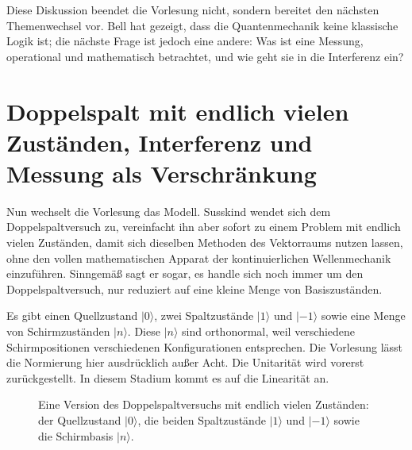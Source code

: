 Diese Diskussion beendet die Vorlesung nicht, sondern bereitet den nächsten Themenwechsel vor. Bell hat gezeigt, dass die Quantenmechanik keine klassische Logik ist; die nächste Frage ist jedoch eine andere: Was ist eine Messung, operational und mathematisch betrachtet, und wie geht sie in die Interferenz ein?

\section{Doppelspalt mit endlich vielen Zuständen, Interferenz und Messung als Verschränkung}

Nun wechselt die Vorlesung das Modell. Susskind wendet sich dem Doppelspaltversuch zu, vereinfacht ihn aber sofort zu einem Problem mit endlich vielen Zuständen, damit sich dieselben Methoden des Vektorraums nutzen lassen, ohne den vollen mathematischen Apparat der kontinuierlichen Wellenmechanik einzuführen. Sinngemäß sagt er sogar, es handle sich noch immer um den Doppelspaltversuch, nur reduziert auf eine kleine Menge von Basiszuständen.

Es gibt einen Quellzustand \(|0\rangle\), zwei Spaltzustände \(|1\rangle\) und \(|-1\rangle\) sowie eine Menge von Schirmzuständen \(|n\rangle\). Diese \(|n\rangle\) sind orthonormal, weil verschiedene Schirmpositionen verschiedenen Konfigurationen entsprechen. Die Vorlesung lässt die Normierung hier ausdrücklich außer Acht. Die Unitarität wird vorerst zurückgestellt. In diesem Stadium kommt es auf die Linearität an.

\begin{figure}[htbp]\centering
{}\caption{Eine Version des Doppelspaltversuchs mit endlich vielen Zuständen: der Quellzustand \(|0\rangle\), die beiden Spaltzustände \(|1\rangle\) und \(|-1\rangle\) sowie die Schirmbasis \(|n\rangle\).}\end{figure}

